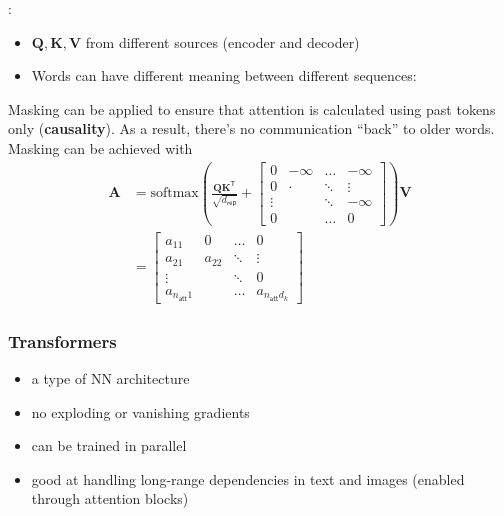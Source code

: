 \newpar{}
:

\begin{itemize}
    \item $\mathbf{Q,K,V}$ from different sources (encoder and decoder)
    \item Words can have different meaning between different sequences:
\end{itemize}

\newpar{}

Masking can be applied to ensure that attention is calculated using past tokens only (\textbf{causality}). As a result, there's no communication ``back'' to older words.
Masking can be achieved with
\noindent\begin{align*}
    \mathbf{A} & = \mathrm{softmax}\left(\frac{\mathbf{QK}^{\mathsf{T}}}{\sqrt{d_{\mathsf{rep}}}}+
    \begin{bmatrix}
        0      & -\infty & \hdots & -\infty \\
        0      & \cdot   & \ddots & \vdots  \\
        \vdots &         & \ddots & -\infty \\
        0      &         & \hdots & 0
    \end{bmatrix}
    \right)\mathbf{V}                                                                                                      \\
               & =  \begin{bmatrix}
                        a_{11}                & 0      & \hdots & 0                                    \\
                        a_{21}                & a_{22} & \ddots & \vdots                               \\
                        \vdots                &        & \ddots & 0                                    \\
                        a_{n_{\mathsf{att}}1} &        & \hdots & a_{n_{\mathsf{att}}d_k}
                    \end{bmatrix}
\end{align*}

\subsubsection{Transformers}
\begin{itemize}
    \item a type of NN architecture
    \item no exploding or vanishing gradients
    \item can be trained in parallel
    \item good at handling long-range dependencies in text and images (enabled through attention blocks)
\end{itemize}

